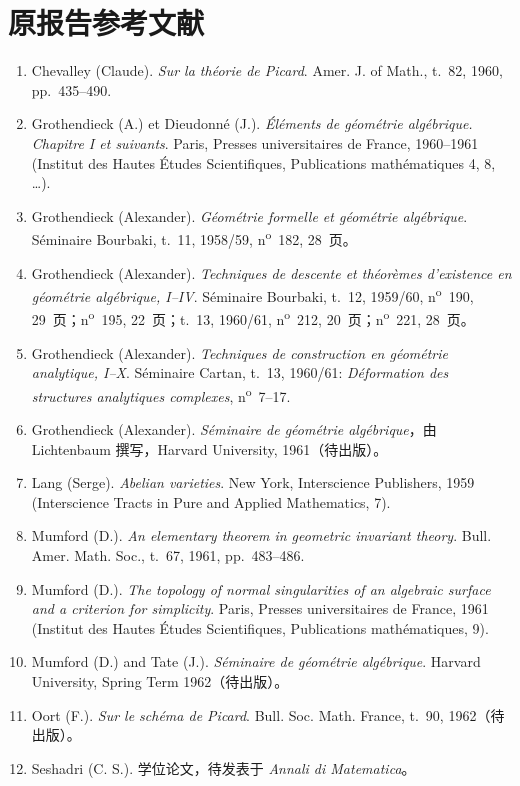 \section*{原报告参考文献}
\begin{enumerate}
\item[{[1]}]\label{fga3.v-bib-1} Chevalley (Claude). \emph{Sur la théorie de Picard}. Amer. J. of Math., t.~82, 1960, pp.~435--490.
\item[{[2]}]\label{fga3.v-bib-2} Grothendieck (A.) et Dieudonné (J.). \emph{Éléments de géométrie algébrique. Chapitre I et suivants}. Paris, Presses universitaires de France, 1960--1961 (Institut des Hautes Études Scientifiques, Publications mathématiques 4, 8, \ldots).
\item[{[3]}]\label{fga3.v-bib-3} Grothendieck (Alexander). \emph{Géométrie formelle et géométrie algébrique}. Séminaire Bourbaki, t.~11, 1958/59, n\textsuperscript{o}~182, 28~页。
\item[{[4]}]\label{fga3.v-bib-4} Grothendieck (Alexander). \emph{Techniques de descente et théorèmes d'existence en géométrie algébrique, I--IV}. Séminaire Bourbaki, t.~12, 1959/60, n\textsuperscript{o}~190, 29~页；n\textsuperscript{o}~195, 22~页；t.~13, 1960/61, n\textsuperscript{o}~212, 20~页；n\textsuperscript{o}~221, 28~页。
\item[{[5]}]\label{fga3.v-bib-5} Grothendieck (Alexander). \emph{Techniques de construction en géométrie analytique, I--X}. Séminaire Cartan, t.~13, 1960/61: \emph{Déformation des structures analytiques complexes}, n\textsuperscript{o}~7--17.
\item[{[6]}]\label{fga3.v-bib-6} Grothendieck (Alexander). \emph{Séminaire de géométrie algébrique}，由 Lichtenbaum 撰写，Harvard University, 1961（待出版）。
\item[{[7]}]\label{fga3.v-bib-7} Lang (Serge). \emph{Abelian varieties}. New York, Interscience Publishers, 1959 (Interscience Tracts in Pure and Applied Mathematics, 7).
\item[{[8]}]\label{fga3.v-bib-8} Mumford (D.). \emph{An elementary theorem in geometric invariant theory}. Bull. Amer. Math. Soc., t.~67, 1961, pp.~483--486.
\item[{[9]}]\label{fga3.v-bib-9} Mumford (D.). \emph{The topology of normal singularities of an algebraic surface and a criterion for simplicity}. Paris, Presses universitaires de France, 1961 (Institut des Hautes Études Scientifiques, Publications mathématiques, 9).
\item[{[10]}]\label{fga3.v-bib-10} Mumford (D.) and Tate (J.). \emph{Séminaire de géométrie algébrique}. Harvard University, Spring Term 1962（待出版）。
\item[{[11]}]\label{fga3.v-bib-11} Oort (F.). \emph{Sur le schéma de Picard}. Bull. Soc. Math. France, t.~90, 1962（待出版）。
\item[{[12]}]\label{fga3.v-bib-12} Seshadri (C. S.). 学位论文，待发表于 \emph{Annali di Matematica}。
\end{enumerate}
